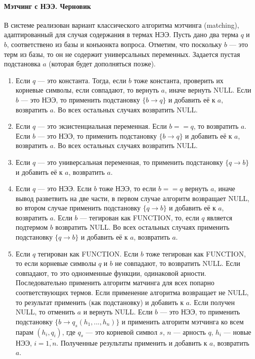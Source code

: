 \paragraph{Мэтчинг с НЭЭ. Черновик} В системе реализован вариант классического алгоритма мэтчинга (matching), адаптированный для случая содержания в термах НЭЭ. Пусть дано два терма $q$ и $b$, соответствено из базы и конъюнкта вопроса. Отметим, что поскольку $b$ --- это терм из базы, то он не содержит универсальных переменных. Задается пустая подстановка $a$ (которая будет дополняться позже).
\begin{enumerate}
\item Если $q$ --- это константа. Тогда, если $b$ тоже константа, проверить их корневые символы, если совпадают, то вернуть $a$, иначе вернуть NULL. Если $b$ --- это НЭЭ, то применить подстановку $\{b \rightarrow q\}$ и добавить её к $a$, возвратить $a$. Во всех остальных случаях возвратить NULL.

\item Если $q$ --- это экзистенциальная переменная. Если $b==q$, то возвратить $a$. Если $b$ --- это НЭЭ, то применить подстановку $\{b \rightarrow q\}$ и добавить её к $a$, возвратить $a$. Во всех остальных случаях возвратить NULL.

\item Если $q$ --- это универсальная переменная, то применить подстановку $\{q \rightarrow b\}$ и добавить её к $a$, возвратить $a$.

\item Если $q$ --- это НЭЭ. Если $b$ тоже НЭЭ, то если $b==q$ вернуть $a$, иначе вывод разветвить на две части, в первом случае алгоритм возвращает NULL, во втором случае применить подстановку $\{q \rightarrow b\}$ и добавить её к $a$, возвратить $a$. Если $b$ --- тегирован как FUNCTION, то, если $q$ является подтермом $b$ возвратить NULL. Во всех остальных случаях применить подстановку $\{q \rightarrow b\}$ и добавить её к $a$, возвратить $a$.

\item Если $q$ тегирован как FUNCTION. Если $b$ тоже тегирован как FUNCTION, то если корневые символы $q$ и $b$ не совпадают, то возвратить NULL. Если совпадают, то это одноименные функции, одинаковой арности. Последовательно применить алгоритм матчинга для всех попарно соответствующих термов. Если применение алгоритма возвращает не NULL, то результат применить (как подстановку) и добавить к $a$. Если получен NULL, то отменить $a$ и вернуть NULL. Если $b$ --- это НЭЭ, то применить подстановку $\{b \rightarrow q_s(h_1,...,h_n)\}$ и применить алгоритм мэтчинга ко всем парам $(h_i, q_i)$, где $q_s$ --- это корневой символ $s$, $n$ --- арность $q$, $h_i$ --- новые НЭЭ, $i = \bar{1,n}$. Полученные результаты применить и добавить к  $a$, возвратить $a$.
\end{enumerate}

